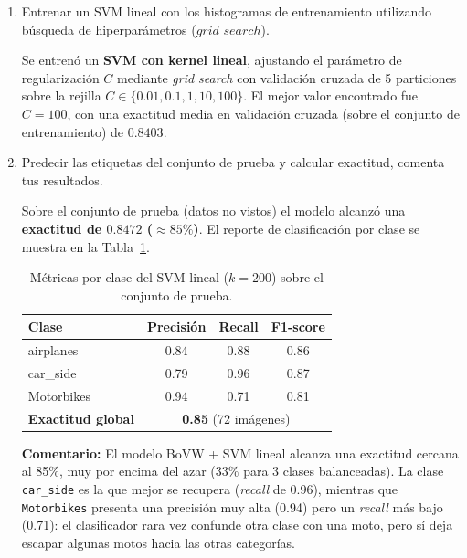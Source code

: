 \documentclass{article}
\begin{document}
\begin{enumerate}
\begin{enumerate}
        \item Entrenar un SVM lineal con los histogramas de entrenamiento utilizando búsqueda de hiperparámetros ($grid$ $search$).

        Se entrenó un \textbf{SVM con kernel lineal}, ajustando el parámetro de
        regularización $C$ mediante \textit{grid search} con validación cruzada de 5
        particiones sobre la rejilla $C \in \{0.01, 0.1, 1, 10, 100\}$. El mejor valor
        encontrado fue \textbf{$C = 100$}, con una exactitud media en validación cruzada
        (sobre el conjunto de entrenamiento) de \textbf{$0.8403$}.

        \item Predecir las etiquetas del conjunto de prueba y calcular exactitud, comenta tus resultados.

        Sobre el conjunto de prueba (datos no vistos) el modelo alcanzó una
        \textbf{exactitud de $0.8472$ ($\approx 85\%$)}. El reporte de clasificación por
        clase se muestra en la Tabla~\ref{tab:reporte}.

        \begin{table}[H]
            \centering
            \begin{tabular}{lccc}
                \toprule
                Clase & Precisión & Recall & F1-score \\
                \midrule
                airplanes  & 0.84 & 0.88 & 0.86 \\
                car\_side  & 0.79 & 0.96 & 0.87 \\
                Motorbikes & 0.94 & 0.71 & 0.81 \\
                \midrule
                \textbf{Exactitud global} & \multicolumn{3}{c}{\textbf{0.85} (72 imágenes)} \\
                \bottomrule
            \end{tabular}
            \caption{Métricas por clase del SVM lineal ($k = 200$) sobre el conjunto de prueba.}
            \label{tab:reporte}
        \end{table}

        \textbf{Comentario:} El modelo BoVW + SVM lineal alcanza una exactitud cercana al
        85\%, muy por encima del azar ($33\%$ para 3 clases balanceadas). La clase
        \texttt{car\_side} es la que mejor se recupera (\textit{recall} de 0.96), mientras
        que \texttt{Motorbikes} presenta una precisión muy alta (0.94) pero un
        \textit{recall} más bajo (0.71): el clasificador rara vez confunde otra clase con una
        moto, pero sí deja escapar algunas motos hacia las otras categorías.


\end{enumerate}
\end{enumerate}
\end{document}
